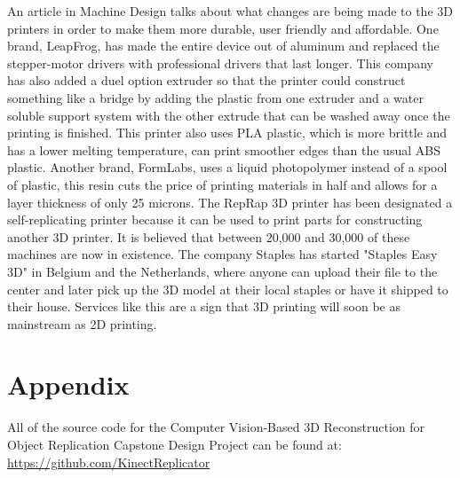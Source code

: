 \documentclass[12pt,twocolumn]{article}
\begin{document}
\indent	An article in Machine Design talks about what changes are being made to the 3D printers in order to make them more durable, user friendly and affordable. One brand, LeapFrog, has made the entire device out of aluminum and  replaced the stepper-motor drivers with professional drivers that last longer. This company has also added a duel option extruder so that the printer could construct something like a bridge by adding the plastic from one extruder and a water soluble support system with the other extrude that can be washed away once the printing is finished. This printer also uses PLA plastic, which is more brittle and has a lower melting temperature, can print smoother edges than the usual ABS plastic. Another brand, FormLabs, uses a liquid photopolymer instead of a spool of plastic, this resin cuts the price of printing materials in half and allows for a layer thickness of only 25 microns. The RepRap 3D printer has been designated a self-replicating printer because it can be used to print parts for constructing another 3D printer. It is believed that between 20,000 and 30,000 of these machines are now in existence.\cite{cite7} The company Staples has started "Staples Easy 3D" in Belgium and the Netherlands, where anyone can upload their file to the center and later pick up the 3D model at their local staples or have it shipped to their house. Services like this are a sign that 3D printing will soon be as mainstream as 2D printing. 


\section{}


\section{Appendix} 
All of the source code for the Computer Vision-Based 3D Reconstruction for Object Replication Capstone Design Project can be found at: \url{https://github.com/KinectReplicator}
\end{document}
